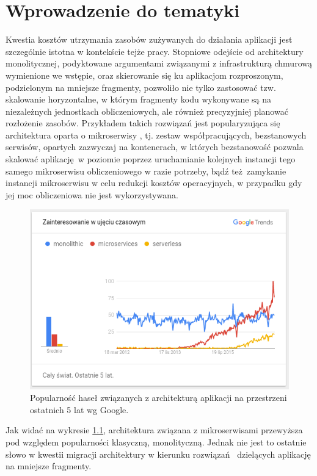 \documentclass[oneside]{mgr}
\begin{document}
\chapter{Wprowadzenie do tematyki}
Kwestia kosztów utrzymania zasobów zużywanych do działania aplikacji jest szczególnie istotna w kontekście tejże pracy. Stopniowe odejście od architektury monolitycznej, podyktowane argumentami związanymi z infrastrukturą chmurową wymienione we wstępie, oraz skierowanie się ku aplikacjom rozproszonym, podzielonym na mniejsze fragmenty, pozwoliło nie tylko zastosować tzw. skalowanie horyzontalne, w którym fragmenty kodu wykonywane są na niezależnych jednostkach obliczeniowych, ale również precyzyjniej planować rozłożenie zasobów. Przykładem takich rozwiązań jest popularyzująca się architektura oparta o mikroserwisy \cite{martinFowlerMicroservices}, tj. zestaw współpracujących, bezstanowych serwisów, opartych zazwyczaj na kontenerach, w których bezstanowość pozwala skalować aplikację w poziomie poprzez uruchamianie kolejnych instancji tego samego mikroserwisu obliczeniowego w razie potrzeby, bądź też zamykanie instancji mikroserwisu w celu redukcji kosztów operacyjnych, w przypadku gdy jej moc obliczeniowa nie jest wykorzystywana.

\begin{figure}
	\centering
	\includegraphics[width=15cm]{2017-03-1321:44:11}
	\caption{Popularność haseł związanych z architekturą aplikacji na przestrzeni ostatnich 5 lat wg Google.}
	\label{fig:popularnoscHaselArchitektury}
\end{figure}

Jak widać na wykresie  \ref{fig:popularnoscHaselArchitektury}, architektura związana z mikroserwisami przewyższa pod względem popularności klasyczną, monolityczną. Jednak nie jest to ostatnie słowo w kwestii migracji architektury w kierunku rozwiązań  dzielących aplikację na mniejsze fragmenty.
\end{document}
